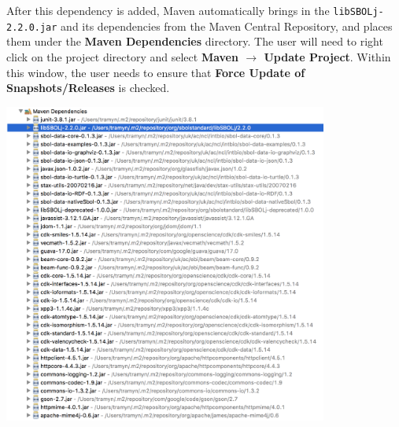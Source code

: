 After this dependency is added, Maven automatically brings in the  {\tt libSBOLj-2.2.0.jar} and its dependencies from the Maven Central Repository, and places them under the {\bf Maven Dependencies} directory. The user will need to right click on the project directory and select {\bf Maven $\rightarrow$ Update Project}. Within this window, the user needs to ensure that {\bf Force Update of Snapshots/Releases} is checked. 
\begin{center}
  \includegraphics[width=0.8\textwidth]{figures/addMavenDependency3}
\end{center}


